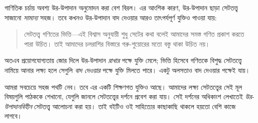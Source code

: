 \documentclass[../../../include/open-logic-section]{subfiles}
\begin{document}
গাণিতিক চর্চায় অবশ্য উর-উপাদান অনুমোদন করা বেশ বিরল।
এর আংশিক কারণ, উর-উপাদান ছাড়া সেটতত্ত্ব সাজানো
\emph{সামান্য} সহজ। তবে কখনও উর-উপাদান বাদ দেওয়ার
আরও তাৎপর্যপূর্ণ যুক্তিও পাওয়া যায়:
\begin{quote}
  সেটতত্ত্ব গণিতের ভিত্তি—এই বিশ্বাস অনুযায়ী শুধু সেটের
  কথা বলেই আমাদের সমস্ত গণিত প্রকাশ করতে পারা উচিত। তাই
  আমাদের চলরাশির বিস্তারে গরু-শুয়োরের মতো বস্তু থাকা উচিত
  নয়।
  \citep[p.~8]{Kunen1980}
\end{quote}
অতএব প্রয়োগযোগ্যতায় জোর দিলে উর-উপাদান \emph{রাখার}
পক্ষে যুক্তি মেলে; ভিত্তি হিসেবে গণিতকে বিশুদ্ধ সেটতত্ত্বে
নামিয়ে আনার লক্ষ্য হলে সেগুলি \emph{বাদ দেওয়ার} পক্ষে
যুক্তি মিলতে পারে। একটু অলসতাও বাদ দেওয়ার পক্ষেই যায়।

আমরা সবচেয়ে সহজ পথটি নেব। তবে এর একটি শিক্ষণগত
যুক্তিও আছে। আমাদের লক্ষ্য সেটতত্ত্বের সেই মূল বিষয়গুলি
পাঠককে শেখানো, যেগুলি জানলে সেটতত্ত্বের দর্শনে প্রবেশ
করা যায়। সেই দর্শনের অধিকাংশ লেখাতেই \emph{উর-উপাদানবিহীন}
সেটতত্ত্ব আলোচনা করা হয়। তাই বইটিও ওই সাহিত্যের
কাছাকাছি থাকলে হয়তো বেশি কাজে লাগবে।
\end{document}
